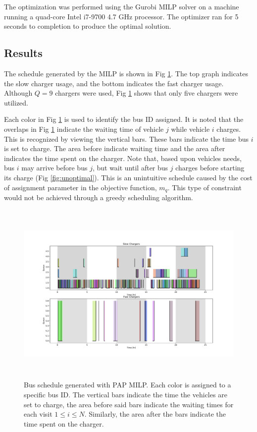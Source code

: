 \documentclass[letterpaper, 10pt, conference]{IEEEtran}
\begin{document}
The optimization was performed using the Gurobi MILP solver \cite{Hespanha2018} on a machine running a quad-core Intel
i7-9700 4.7 GHz processor. The optimizer ran for 5 seconds to completion to produce the optimal solution.

\subsection{Results}
The schedule generated by the MILP is shown in Fig \ref{fig:schedule}. The top graph indicates the slow charger usage,
and the bottom indicates the fast charger usage. Although $Q = 9$ chargers were used, Fig \ref{fig:schedule} shows that
only five chargers were utilized.

Each color in Fig \ref{fig:schedule} is used to identify the bus ID assigned. It is noted that the overlaps in Fig
\ref{fig:schedule} indicate the waiting time of vehicle $j$ while vehicle $i$ charges. This is recognized by viewing the
vertical bars. These bars indicate the time bus $i$ is set to charge. The area before indicate waiting time and the area
after indicates the time spent on the charger. Note that, based upon vehicles needs, bus $i$ may arrive before bus $j$,
but wait until after bus $j$ charges before starting its charge (Fig \ref{fig:unoptimal}). This is an unintuitive
schedule caused by the cost of assignment parameter in the objective function, $m_q$. This type of constraint would not
be achieved through a greedy scheduling algorithm.

\begin{figure}[ht]
	\centering
	\includegraphics[trim=1.5in 0.25in 1.5in 0.5in, width=\linewidth, height=9cm]{schedule.pdf}
	\caption{Bus schedule generated with PAP MILP. Each color is assigned to a specific bus ID. The vertical bars indicate the time the vehicles are set to charge, the area before said bars indicate the waiting times for each visit $1 \leq i \leq N$. Similarly, the area after the bars indicate the time spent on the charger.}
	\label{fig:schedule}
\end{figure}
\end{document}
